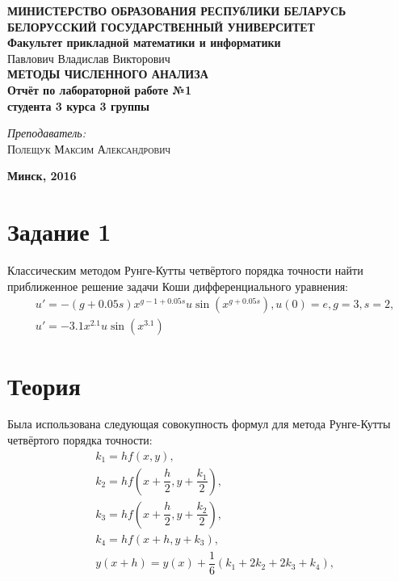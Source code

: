 \documentclass[10pt,a4paper,oneside,russian]{article}
\begin{document}
\begin{titlepage}
  \begin{center}
    \textbf{\large МИНИСТЕРСТВО ОБРАЗОВАНИЯ РЕСПУбЛИКИ БЕЛАРУСЬ} \\[1.0cm]
    \textbf{\large БЕЛОРУССКИЙ ГОСУДАРСТВЕННЫЙ УНИВЕРСИТЕТ} \\[1.0cm]
    \textbf{\large Факультет прикладной математики и информатики} \\[4.7cm]

    \Large Павлович Владислав Викторович \\[0.2cm]
    \textbf{\LARGE МЕТОДЫ ЧИСЛЕННОГО АНАЛИЗА}\\[1.0cm]
    \textbf{\Large Отчёт по лабораторной работе №1\\
      студента 3 курса 3 группы} \\[3.5cm]

    \begin{flushright} \large
      \emph{Преподаватель:} \\
      \textsc{Полещук Максим Александрович}
    \end{flushright}
    \vfill

    \textbf{\large {Минск, 2016}}
  \end{center}
  \thispagestyle{empty}
\end{titlepage}
\begin{titlepage}
  \tableofcontents
  \thispagestyle{empty}
\end{titlepage}

\section{Задание 1}
Классическим методом Рунге-Кутты четвёртого порядка точности найти приближенное
решение задачи Коши дифференциального уравнения:
\begin{align*}
  &u' = -(g + 0.05s)x^{g-1+0.05s}u\sin(x^{g+0.05s}), u(0) = e, g = 3, s = 2,\\
  &u' = -3.1x^{2.1}u\sin(x^{3.1})
\end{align*}

\section{Теория}
Была использована следующая совокупность формул для метода Рунге-Кутты четвёртого
порядка точности:
\begin{align*}
  &k_1 = hf(x, y),\\
  &k_2 = hf\left(x + \dfrac{h}{2}, y + \dfrac{k_1}{2}\right),\\
  &k_3 = hf\left(x + \dfrac{h}{2}, y + \dfrac{k_2}{2}\right),\\
  &k_4 = hf(x + h, y + k_3),\\
  &y(x + h) = y(x) + \dfrac{1}{6}(k_1 + 2k_2 + 2k_3 + k_4),\\
\end{align*}
\end{document}
